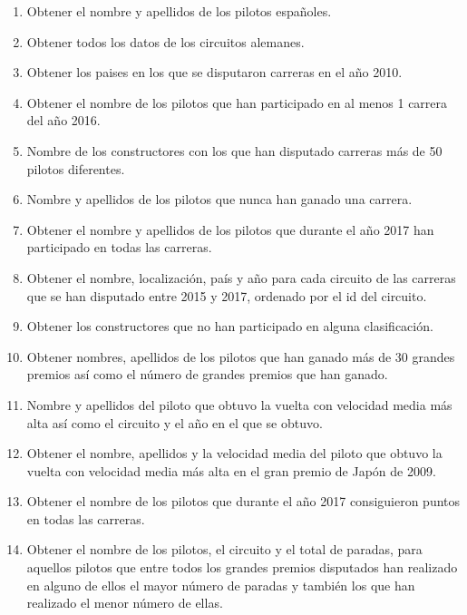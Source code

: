 \documentclass{db-practice}
\begin{document}
\begin{enumerate}
    \item Obtener el nombre y apellidos de los pilotos españoles.

    \item Obtener todos los datos de los circuitos alemanes.
    
    \item Obtener los paises en los que se disputaron carreras en el año 2010.

    \item Obtener el nombre de los pilotos que han participado en al menos 1 carrera del año 2016.

    \item Nombre de los constructores con los que han disputado carreras más de 50 pilotos diferentes.
    
    \item Nombre y apellidos de los pilotos que nunca han ganado una carrera.
              
    \item Obtener el nombre y apellidos de los pilotos que durante el año 2017 han participado en todas las carreras.
    
    \item Obtener el nombre, localización, país y año para cada circuito de las carreras que se han disputado entre 2015 y 2017, ordenado por el id del circuito.
    
    \item Obtener los constructores que no han participado en alguna clasificación.
              
    \item Obtener nombres, apellidos de los pilotos que han ganado más de 30 grandes premios así como el número de grandes premios que han ganado.
       
    \item Nombre y apellidos del piloto que obtuvo la vuelta con velocidad media más alta así como el circuito y el año en el que se obtuvo.
    
    \item Obtener el nombre, apellidos y la velocidad media del piloto que obtuvo la vuelta con velocidad media más alta en el gran premio de Japón de 2009.
             
    \item Obtener el nombre de los pilotos que durante el año 2017 consiguieron puntos en todas las carreras.
    
    \item Obtener el nombre de los pilotos, el circuito y el total de paradas, para aquellos pilotos que entre todos los grandes premios disputados han realizado en alguno de ellos el mayor número de paradas y también los que han realizado el menor número de ellas.
      

\end{enumerate}
\end{document}
